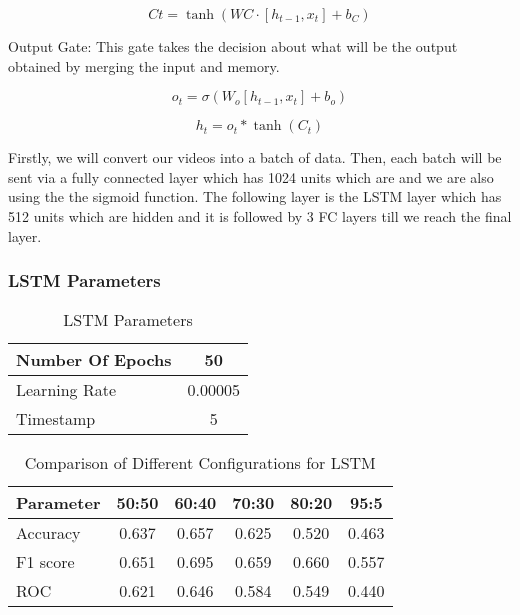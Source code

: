 \documentclass{article}
\begin{document}
\begin{equation}
    \label{eq-add}
{C}{t}=\tanh \left(W{C} \cdot\left[h_{t-1}, x_{t}\right]+b_{C}\right)
\end{equation}
\bigskip

Output Gate: This  gate takes the decision about what will be  the output obtained  by merging the input and memory.


\begin{equation}
    \label{eq-add}
o_{t}=\sigma\left(W_{o}\left[h_{t-1}, x_{t}\right]+b_{o}\right)
\end{equation}
\bigskip

\begin{equation}
    \label{eq-add}
h_{t}=o_{t} * \tanh \left(C_{t}\right)
\end{equation}

Firstly, we will convert our videos into a batch of data. Then, each batch will be sent via a fully connected layer which has 1024 units which are and we are also using the the sigmoid function. The following layer is the LSTM layer which has 512 units which are hidden and it is followed by 3 FC layers till we reach the final layer.

\subsubsection{LSTM Parameters}
 \begin{table}[!h]
\centering
\begin{tabular}{|l|c|}

\hline
Number Of Epochs & 50 \\
\hline
Learning Rate & 0.00005\\
\hline
Timestamp & 5\\
\hline


\end{tabular}
\caption{LSTM Parameters}
\label{tbl:dataset}
\end{table}


\begin{table}[!h]
\centering
\begin{tabular}{|l|c|c|c|c|c|}
\hline
\textbf{Parameter} &  \textbf{50:50} &  \textbf{60:40} &  \textbf{70:30} &  \textbf{80:20} &  \textbf{95:5} \\
\hline
Accuracy & 0.637 & 0.657 & 0.625 & 0.520 & 0.463\\
\hline
F1 score & 0.651 & 0.695 & 0.659 & 0.660 & 0.557\\
\hline
ROC & 0.621 & 0.646 & 0.584 & 0.549 & 0.440\\
\hline


\end{tabular}
\caption{Comparison of Different Configurations for LSTM}
\label{tbl:dataset}
\end{table}
\bigskip
\end{document}
